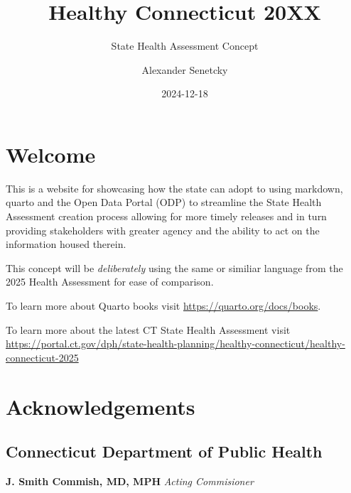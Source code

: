 \documentclass[
  letterpaper,
  DIV=11,
  numbers=noendperiod]{scrreprt}
\title{Healthy Connecticut 20XX}
\subtitle{State Health Assessment Concept}
\author{Alexander Senetcky}
\date{2024-12-18}
\renewcommand*\contentsname{Table of contents}
\newcommand\contentsname{Table of contents}
\begin{document}
\maketitle

\renewcommand*\contentsname{Table of contents}
{
\hypersetup{linkcolor=}
\setcounter{tocdepth}{2}
\tableofcontents
}


\chapter*{Welcome}\label{welcome}


This is a website for showcasing how the state can adopt to using
markdown, quarto and the Open Data Portal (ODP) to streamline the State
Health Assessment creation process allowing for more timely releases and
in turn providing stakeholders with greater agency and the ability to
act on the information housed therein.

This concept will be \emph{deliberately} using the same or similiar
language from the 2025 Health Assessment for ease of comparison.

To learn more about Quarto books visit
\url{https://quarto.org/docs/books}.

To learn more about the latest CT State Health Assessment visit
\url{https://portal.ct.gov/dph/state-health-planning/healthy-connecticut/healthy-connecticut-2025}


\chapter*{Acknowledgements}\label{acknowledgements}


\section*{Connecticut Department of Public
Health}\label{connecticut-department-of-public-health}


\textbf{J. Smith Commish, MD, MPH } \emph{Acting Commisioner}
\end{document}
